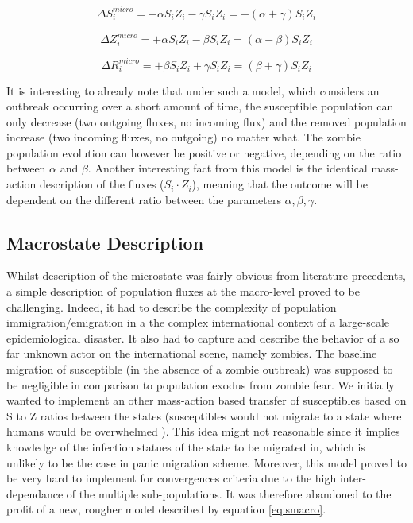 \documentclass[11pt]{article} %
\begin{document}
\begin{equation}  \label{eq:smicro}
\Delta S_{i}^{micro} = -\alpha S_{i} Z_{i} -\gamma S_{i} Z_{i} = -(\alpha + \gamma) S_{i} Z_{i}
\end{equation}

\begin{equation} \label{eq:zmicro}
\Delta Z_{i}^{micro} = +\alpha S_{i} Z_{i} - \beta S_{i} Z_{i} = (\alpha - \beta) S_{i} Z_{i}
\end{equation}

\begin{equation} \label{eq:rmicro}
\Delta R_{i}^{micro} = +\beta S_{i} Z_{i} + \gamma S_{i} Z_{i} = (\beta + \gamma) S_{i} Z_{i}
\end{equation}
\bigskip

It is interesting to already note that under such a model, which considers an outbreak occurring over a short amount of time, the susceptible population can only decrease (two outgoing fluxes, no incoming flux) and the removed population increase (two incoming fluxes, no outgoing) no matter what. The zombie population evolution can however be positive or negative, depending on the ratio between $\alpha$ and $\beta$. Another interesting fact from this model is the identical mass-action description of the fluxes ($S_{i} \cdot Z_{i}$), meaning that the outcome will be dependent on the different ratio between the parameters $\alpha, \beta, \gamma$.

\subsection{Macrostate Description}\indent

Whilst description of the microstate was fairly obvious from literature precedents, a simple description of population fluxes at the macro-level proved to be challenging. Indeed, it had to describe the complexity of population immigration/emigration in a the complex international context of a large-scale epidemiological disaster. It also had to capture and describe the behavior of a so far unknown actor on the international scene, namely zombies. The baseline migration of susceptible (in the absence of a zombie outbreak) was supposed to be negligible in comparison to population exodus from zombie fear. We initially wanted to implement an other mass-action based transfer of susceptibles based on S to Z ratios between the states (susceptibles would not migrate to a state where humans would be overwhelmed ). This idea might not reasonable since it implies knowledge of the infection statues of the state to be migrated in, which is unlikely to be the case in panic migration scheme. Moreover, this model proved to be very hard to implement for convergences criteria due to the high inter-dependance of the multiple sub-populations. It was therefore abandoned to the profit of a new, rougher model described by equation \eqref{eq:smacro}. 
\end{document}
